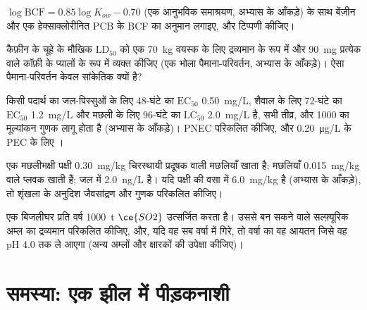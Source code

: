 \begin{exercise}[$\star\star$]\label{exo:b3:environmental-toxicology:8}
$\log\mathrm{BCF} = 0.85\log K_{ow} - 0.70$ (एक आनुभविक समाश्रयण, अभ्यास के आँकड़े) के साथ बेंज़ीन और एक हेक्साक्लोरीनित
PCB के BCF का अनुमान लगाइए, और टिप्पणी कीजिए।
\end{exercise}

\begin{exercise}[$\star\star$]\label{exo:b3:environmental-toxicology:9}
कैफ़ीन के चूहे के मौखिक $\mathrm{LD_{50}}$ को एक \qty{70}{kg} वयस्क के लिए द्रव्यमान के रूप में और
\qty{90}{mg} प्रत्येक वाले कॉफ़ी के प्यालों के रूप में व्यक्त कीजिए (एक भोला पैमाना-परिवर्तन, अभ्यास के आँकड़े)। ऐसा पैमाना-परिवर्तन केवल सांकेतिक क्यों है?
\end{exercise}

\begin{exercise}[$\star\star\star$]\label{exo:b3:environmental-toxicology:10}
किसी पदार्थ का जल-पिस्सुओं के लिए 48-घंटे का $\mathrm{EC_{50}}$ \qty{0.50}{mg/L}, शैवाल के लिए 72-घंटे का $\mathrm{EC_{50}}$ \qty{1.2}{mg/L}
और मछली के लिए 96-घंटे का $\mathrm{LC_{50}}$ \qty{2.0}{mg/L} है, सभी तीव्र, और 1000 का मूल्यांकन गुणक लागू होता है
(अभ्यास के आँकड़े)। PNEC परिकलित कीजिए, और \qty{0.20}{\micro g/L} के PEC के लिए ।
\end{exercise}

\begin{exercise}[$\star\star\star$]\label{exo:b3:environmental-toxicology:11}
एक मछलीभक्षी पक्षी \qty{0.30}{mg/kg} चिरस्थायी प्रदूषक वाली मछलियाँ खाता है; मछलियाँ
\qty{0.015}{mg/kg} वाले प्लवक खाती हैं; जल में \qty{2.0}{ng/L} है। यदि पक्षी की वसा में \qty{6.0}{mg/kg} है (अभ्यास के
आँकड़े), तो शृंखला के अनुदिश जैवसांद्रण और  गुणक परिकलित कीजिए।
\end{exercise}

\begin{exercise}[$\star\star\star$]\label{exo:b3:environmental-toxicology:12}
एक बिजलीघर प्रति वर्ष \qty{1000}{t} $\ce{SO2}$ उत्सर्जित करता है। उससे बन सकने वाले सल्फ़्यूरिक अम्ल का द्रव्यमान परिकलित कीजिए,
और, यदि वह सब वर्षा में गिरे, तो वर्षा का वह आयतन जिसे वह pH 4.0 तक ले आएगा (अन्य
अम्लों और क्षारकों की उपेक्षा कीजिए)।
\end{exercise}

\section{समस्या: एक झील में पीड़कनाशी}

